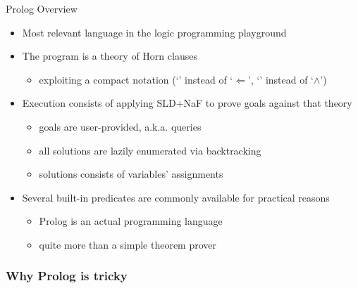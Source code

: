 \documentclass[presentation]{beamer}\mode<presentation>{\usetheme{AMSBolognaFC}}
\begin{document}
\begin{frame}{Prolog Overview}
\label{slide:prolog}
    \begin{itemize}
        \item Most relevant language in the \alert{logic programming} playground

        \vfill

        \item The \alert{program} is a \alert{theory} of Horn clauses
        \begin{itemize}
            \item exploiting a compact notation (`\pl{:-}' instead of `$\Leftarrow$', `\pl{,}' instead of `$\wedge$')
        \end{itemize}

        \vfill

        \item Execution consists of applying SLD+NaF to prove \alert{goals} against that theory
        \begin{itemize}
            \item goals are user-provided, a.k.a. \alert{queries}
            \item all solutions are \alert{lazily} enumerated via \alert{backtracking}
            \item solutions consists of variables' \alert{assignments}
        \end{itemize}

        \vfill

        \item Several built-in predicates are commonly available for practical reasons
        \begin{itemize}
            \item Prolog is an actual programming language
            \item quite more than a simple theorem prover
        \end{itemize}
    \end{itemize}
\end{frame}

\subsubsection{Why Prolog is tricky}
\end{document}
